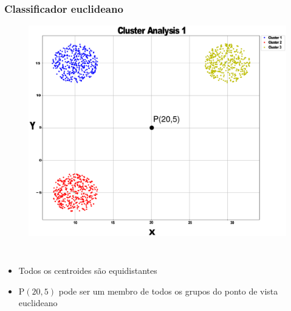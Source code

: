 \documentclass[aspectratio=10]{beamer} %
\begin{document}
\begin{frame}
	\frametitle{Classificador euclideano}
	\begin{figure}[H]
		\includegraphics[scale=0.1]{Imagens/clusteranalise1.eps}
	\end{figure}
	
	\begin{columns}
		\footnotesize
		\justifying
		\begin{itemize}
			\footnotesize
			\item  Todos os centroides são equidistantes 
			\pause
			\item P$(20,5)$ pode ser um membro de todos os grupos do ponto de vista euclideano  
		\end{itemize}
	\end{columns}
	
\end{frame}
\end{document}
